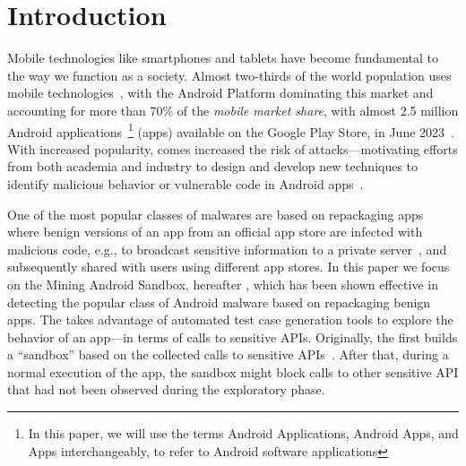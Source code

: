 \section{Introduction}\label{sec:introduction}

Mobile technologies like smartphones and tablets have become fundamental to the way we function as a society. Almost two-thirds of the world population
uses mobile technologies~\cite{Comscore,DBLP:journals/tse/MartinSJZH17}, with the
Android Platform dominating this market and accounting for more than 70\% of the \emph{mobile
market share}, with almost 2.5 million Android applications~\footnote{In this paper, we will use the terms Android Applications, Android Apps, and Apps interchangeably, to refer to Android software applications} (apps)
available on the Google Play Store, in June 2023~\cite{Statista}. 
With increased popularity, comes increased the risk of attacks---motivating efforts from both academia and industry to design and develop new techniques
to identify malicious behavior or vulnerable code in Android apps~\cite{10.1145/3017427}.


One of the most popular classes of malwares are based on repackaging apps~\cite{DBLP:conf/wcre/BaoLL18,le2018towards} where benign
versions of an app from an official app store are
infected with malicious code, e.g., to broadcast
sensitive information to a private server~\cite{DBLP:journals/tse/LiBK21}, and subsequently shared
with users using different app stores. In this paper we focus on the Mining Android Sandbox, hereafter \mas, which has been shown effective
in detecting the popular class of Android malware based on 
repackaging benign apps. 
The \mas takes advantage of automated test case generation tools 
to explore the behavior of an app---in terms of calls to sensitive APIs. Originally, the \mas first builds a ``sandbox'' based on the collected calls to sensitive APIs~\cite{DBLP:conf/icse/JamrozikSZ16}. After that, during a normal
execution of the app, the sandbox might block calls to other sensitive API
that had not been observed during the exploratory phase. 


